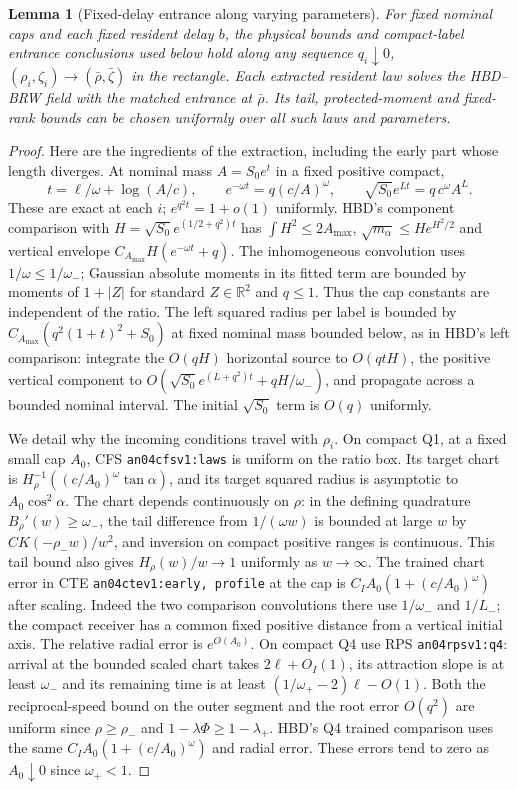 \documentclass[11pt]{article}
\newtheorem{lemma}{Lemma}
\begin{document}
\begin{lemma}[Fixed-delay entrance along varying parameters]\label{an04e5rv1:matching}
For fixed nominal caps and each fixed resident delay $b$, the physical bounds and compact-label entrance conclusions used below hold along any sequence $q_i\downarrow0$, $(\rho_i,\zeta_i)\to(\bar\rho,\bar\zeta)$ in the rectangle. Each extracted resident law solves the HBD--BRW field with the matched entrance at $\bar\rho$. Its tail, protected-moment and fixed-rank bounds can be chosen uniformly over all such laws and parameters.
\end{lemma}
\begin{proof}
Here are the ingredients of the extraction, including the early part whose length diverges. At nominal mass $A=S_0e^t$ in a fixed positive compact,
\[
 t=\ell/\omega+\log(A/c),\qquad
 e^{-\omega t}=q(c/A)^\omega,\qquad
 \sqrt{S_0}e^{Lt}=q\,c^\omega A^L .
\]
These are exact at each $i$; $e^{q^2t}=1+o(1)$ uniformly. HBD's component comparison with $H=\sqrt{S_0}e^{(1/2+q^2)t}$ has $\int H^2\le2A_{\max}$, $\sqrt{m_\alpha}\le H e^{H^2/2}$ and vertical envelope $C_{A_{\max}}H(e^{-\omega t}+q)$. The inhomogeneous convolution uses $1/\omega\le1/\omega_-$; Gaussian absolute moments in its fitted term are bounded by moments of $1+|Z|$ for standard $Z\in\mathbb R^2$ and $q\le1$. Thus the cap constants are independent of the ratio. The left squared radius per label is bounded by $C_{A_{\max}}(q^2(1+t)^2+S_0)$ at fixed nominal mass bounded below, as in HBD's left comparison: integrate the $O(qH)$ horizontal source to $O(qtH)$, the positive vertical component to $O(\sqrt{S_0}e^{(L+q^2)t}+qH/\omega_-)$, and propagate across a bounded nominal interval. The initial $\sqrt{S_0}$ term is $O(q)$ uniformly.

We detail why the incoming conditions travel with $\rho_i$. On compact Q1, at a fixed small cap $A_0$, CFS \texttt{an04cfsv1:laws} is uniform on the ratio box. Its target chart is $H_\rho^{-1}((c/A_0)^\omega\tan\alpha)$, and its target squared radius is asymptotic to $A_0\cos^2\alpha$. The chart depends continuously on $\rho$: in the defining quadrature $B_\rho'(w)\ge\omega_-$, the tail difference from $1/(\omega w)$ is bounded at large $w$ by $C K(-\rho_- w)/w^2$, and inversion on compact positive ranges is continuous. This tail bound also gives $H_\rho(w)/w\to1$ uniformly as $w\to\infty$. The trained chart error in CTE \texttt{an04ctev1:early, profile} at the cap is $C_I A_0(1+(c/A_0)^\omega)$ after scaling. Indeed the two comparison convolutions there use $1/\omega_-$ and $1/L_-$; the compact receiver has a common fixed positive distance from a vertical initial axis. The relative radial error is $e^{O(A_0)}$. On compact Q4 use RPS \texttt{an04rpsv1:q4}: arrival at the bounded scaled chart takes $2\ell+O_I(1)$, its attraction slope is at least $\omega_-$ and its remaining time is at least $(1/\omega_+-2)\ell-O(1)$. Both the reciprocal-speed bound on the outer segment and the root error $O(q^2)$ are uniform since $\rho\ge\rho_-$ and $1-\lambda\Phi\ge1-\lambda_+$. HBD's Q4 trained comparison uses the same $C_I A_0(1+(c/A_0)^\omega)$ and radial error. These errors tend to zero as $A_0\downarrow0$ since $\omega_+<1$.


\end{proof}
\end{document}
